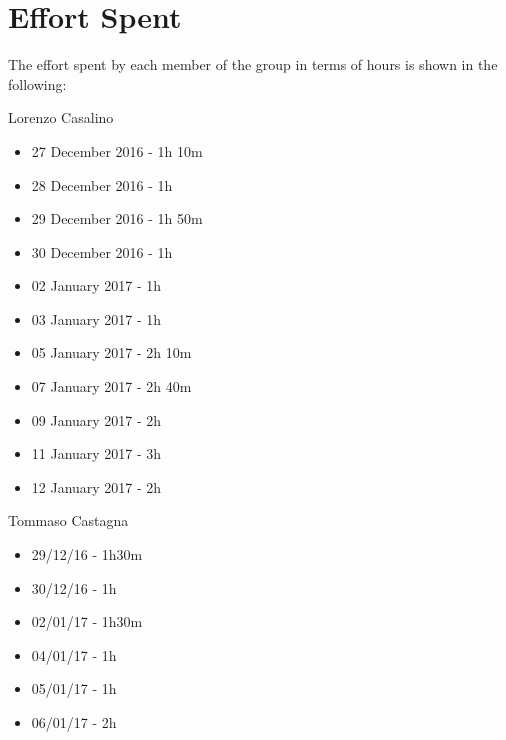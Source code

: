 \section{Effort Spent}

The effort spent by each member of the group in terms of hours is shown in the following:

Lorenzo Casalino

\begin{itemize}
	\item 27 December 2016 - 1h 10m
	\item 28 December 2016 - 1h
	\item 29 December 2016 - 1h 50m
	\item 30 December 2016 - 1h
	\item 02 January  2017 - 1h
	\item 03 January  2017 - 1h
	\item 05 January  2017 - 2h 10m
	\item 07 January  2017 - 2h 40m
	\item 09 January 2017 - 2h
	\item 11 January 2017 - 3h
	\item 12 January 2017 - 2h
\end{itemize}

Tommaso Castagna

\begin{itemize}
	\item 29/12/16 - 1h30m
	\item 30/12/16 - 1h
	\item 02/01/17 - 1h30m
	\item 04/01/17 - 1h
	\item 05/01/17 - 1h
	\item 06/01/17 - 2h
\end{itemize}
